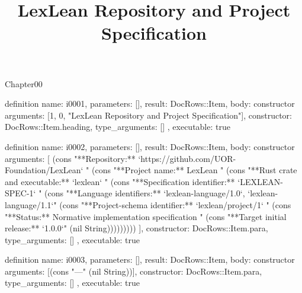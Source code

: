 \begin{lexlean}{Chapter00}
\title{LexLean Repository and Project Specification}
\begin{semanticmodule}
definition{
  name: i0001,
  parameters: [],
  result: DocRows::Item,
  body: constructor{
    arguments: [1, 0, "LexLean Repository and Project Specification"],
    constructor: DocRows::Item.heading,
    type_arguments: []
  },
  executable: true
}

definition{
  name: i0002,
  parameters: [],
  result: DocRows::Item,
  body: constructor{
    arguments: [
      (cons "**Repository:** `https://github.com/UOR-Foundation/LexLean`  " (cons "**Project name:** LexLean  " (cons "**Rust crate and executable:** `lexlean`  " (cons "**Specification identifier:** `LEXLEAN-SPEC-1`  " (cons "**Language identifiers:** `lexlean-language/1.0`, `lexlean-language/1.1`" (cons "**Project-schema identifier:** `lexlean/project/1`  " (cons "**Status:** Normative implementation specification  " (cons "**Target initial release:** `1.0.0`" (nil String)))))))))
    ],
    constructor: DocRows::Item.para,
    type_arguments: []
  },
  executable: true
}

definition{
  name: i0003,
  parameters: [],
  result: DocRows::Item,
  body: constructor{
    arguments: [(cons "---" (nil String))],
    constructor: DocRows::Item.para,
    type_arguments: []
  },
  executable: true
}
\end{semanticmodule}
\end{lexlean}
